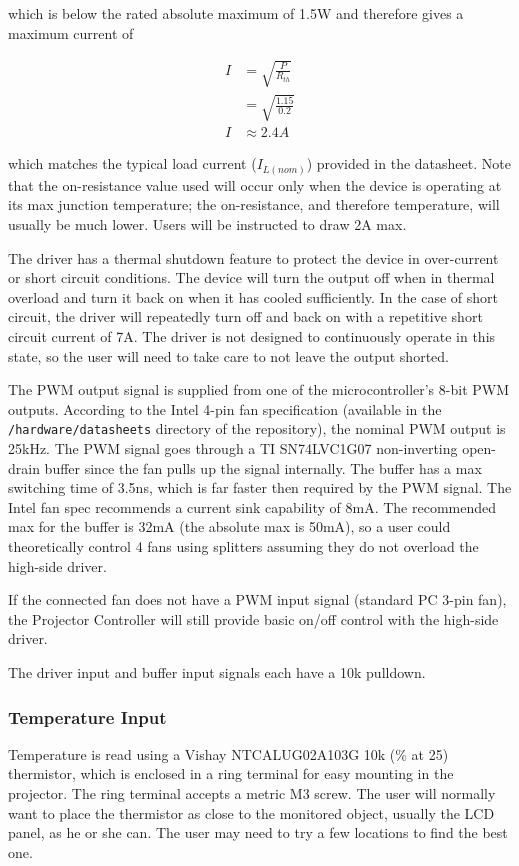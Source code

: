 \documentclass{article}
\begin{document}
which is below the rated absolute maximum of 1.5W and therefore gives a maximum current of

\begin{align*}
    I &= \sqrt{\frac{P}{R_{th}}} \\
    &= \sqrt{\frac{1.15}{0.2}} \\
    I &\approx 2.4A
\end{align*}

which matches the typical load current ($I_{L(nom)}$) provided in the datasheet.  Note that the
on-resistance value used will occur only when the device is operating at its max junction
temperature; the on-resistance, and therefore temperature, will usually be much lower.  Users will
be instructed to draw 2A max.

The driver has a thermal shutdown feature to protect the device in over-current or short circuit
conditions.  The device will turn the output off when in thermal overload and turn it back on when
it has cooled sufficiently.  In the case of short circuit, the driver will repeatedly turn off and
back on with a repetitive short circuit current of 7A.  The driver is not designed to continuously
operate in this state, so the user will need to take care to not leave the output shorted.

The PWM output signal is supplied from one of the microcontroller's 8-bit PWM outputs.  According to
the Intel 4-pin fan specification (available in the \texttt{/hardware/datasheets} directory of the
repository), the nominal PWM output is 25kHz.  The PWM signal goes through a TI SN74LVC1G07
non-inverting open-drain buffer since the fan pulls up the signal internally. The buffer has a max
switching time of 3.5ns, which is far faster then required by the PWM signal.  The Intel fan spec
recommends a current sink capability of 8mA.  The recommended max for the buffer is 32mA (the
absolute max is 50mA), so a user could theoretically control 4 fans using splitters assuming they do
not overload the high-side driver.

If the connected fan does not have a PWM input signal (standard PC 3-pin fan), the Projector
Controller will still provide basic on/off control with the high-side driver.

The driver input and buffer input signals each have a 10k\textOmega{} pulldown.

\subsubsection{Temperature Input} \label{sssec:TempInput}
Temperature is read using a Vishay NTCALUG02A103G 10k (\% at 25\textcelsius) thermistor,
which is enclosed in a ring terminal for easy mounting in the projector.  The ring terminal accepts
a metric M3 screw.  The user will normally want to place the thermistor as close to the monitored
object, usually the LCD panel, as he or she can.  The user may need to try a few locations to find
the best one.
\end{document}
